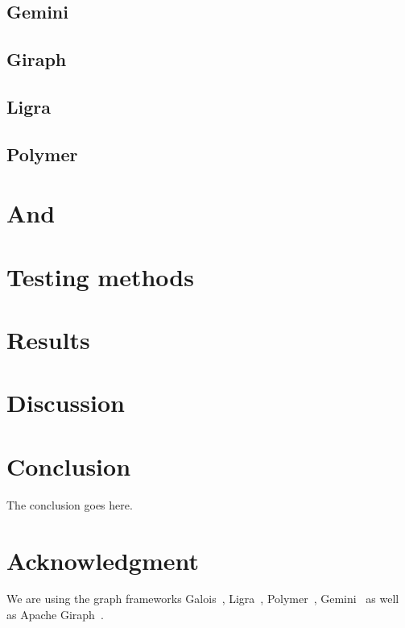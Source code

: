 \documentclass[conference,a4paper]{IEEEtran}
\begin{document}
\subsection{Gemini}


\subsection{Giraph}


\subsection{Ligra}


\subsection{Polymer}



\section{And}

\section{Testing methods}


\section{Results}



\section{Discussion}




\section{Conclusion}
The conclusion goes here.


\clearpage


\section*{Acknowledgment}
We are using the graph frameworks Galois~\cite{Galois}, Ligra~\cite{Ligra}, Polymer~\cite{Polymer}, Gemini~\cite{Gemini} as well as Apache Giraph~\cite{Giraph}.
\end{document}
